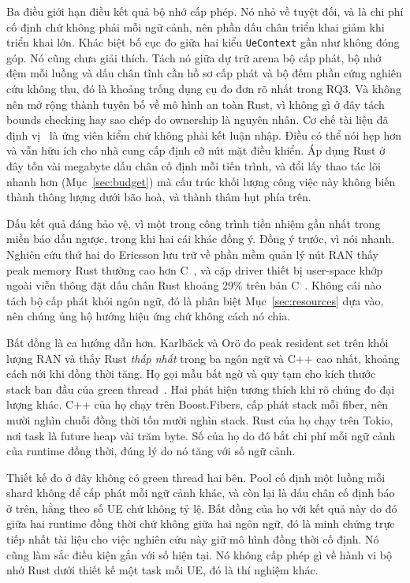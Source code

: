 Ba điều giới hạn điều kết quả bộ nhớ cấp phép. Nó nhỏ về tuyệt đối, và là
chi phí cố định chứ không phải mỗi ngữ cảnh, nên phần dấu chân triển khai
giảm khi triển khai lớn. Khác biệt bố cục đo giữa hai kiểu
\texttt{UeContext} gần như không đóng góp. Nó cũng chưa giải thích. Tách nó
giữa dự trữ arena bộ cấp phát, bộ nhớ đệm mỗi luồng và dấu chân tĩnh cần hồ sơ
cấp phát và bộ đếm phần cứng nghiên cứu không thu, đó là khoảng trống dụng cụ đo đơn
rõ nhất trong RQ3. Và không nên mở rộng thành tuyên bố về mô hình an toàn Rust, vì không gì ở đây tách bounds checking hay sao chép do ownership là nguyên nhân.
Cơ chế tài liệu đã định vị~\cite{zhang2022runtime,harris2023morello}
là ứng viên kiểm chứ không phải kết luận nhập. Điều có thể nói hẹp hơn và vẫn
hữu ích cho nhà cung cấp định cỡ nút mặt điều khiển. Áp dụng Rust ở đây tốn vài megabyte
dấu chân cố định mỗi tiến trình, và đổi lấy thao tác lõi nhanh hơn
(Mục~\ref{sec:budget}) mà cấu trúc khối lượng công việc này không biến thành thông lượng dưới
bão hoà, và thành thâm hụt phía trên.

Dấu kết quả đáng bảo vệ, vì một trong công trình tiền nhiệm gần nhất trong miền
báo dấu ngược, trong khi hai cái khác đồng ý. Đồng ý trước, vì nói nhanh.
Nghiên cứu thứ hai do Ericsson lưu trữ về phần mềm quản lý nút RAN thấy peak memory Rust
thường cao hơn C~\cite{olsson2023ranmgmt}, và cặp driver thiết bị user-space khớp
ngoài viễn thông đặt dấu chân Rust khoảng 29\% trên bản
C~\cite{sundvisson2026drivers}. Không cái nào tách bộ cấp phát khỏi ngôn ngữ, đó là
phân biệt Mục~\ref{sec:resources} dựa vào, nên chúng ủng hộ hướng
hiệu ứng chứ không cách nó chia.

Bất đồng là ca hướng dẫn hơn. Karlb\"ack và Or\"o đo peak resident set trên khối lượng RAN và
thấy Rust \emph{thấp nhất} trong ba ngôn ngữ và C++ cao nhất, khoảng cách nới
khi đồng thời tăng. Họ gọi mẫu bất ngờ và quy tạm cho kích thước stack ban đầu
của green thread~\cite{karlback2021ran}. Hai
phát hiện tương thích khi rõ chúng đo đại lượng khác. C++ của họ
chạy trên Boost.Fibers, cấp phát stack mỗi fiber, nên mười nghìn chuỗi đồng thời tốn
mười nghìn stack. Rust của họ chạy trên Tokio, nơi task là future heap vài
trăm byte. Số của họ do đó bắt chi phí mỗi ngữ cảnh của runtime
đồng thời, đúng lý do nó tăng với số ngữ cảnh.

Thiết kế đo ở đây
không có green thread hai bên. Pool cố định một luồng mỗi shard không để cấp phát mỗi ngữ cảnh
khác, và còn lại là dấu chân cố định báo ở trên, hằng theo số UE chứ không tỷ lệ. Bất đồng của họ với kết quả này do đó
giữa hai runtime đồng thời chứ không giữa hai ngôn ngữ, đó là minh chứng trực tiếp
nhất tài liệu cho việc nghiên cứu này giữ mô hình đồng thời cố định. Nó cũng
làm sắc điều kiện gắn với số hiện tại. Nó không cấp phép gì về hành vi bộ nhớ Rust
dưới thiết kế một task mỗi UE, đó là thí nghiệm khác.

